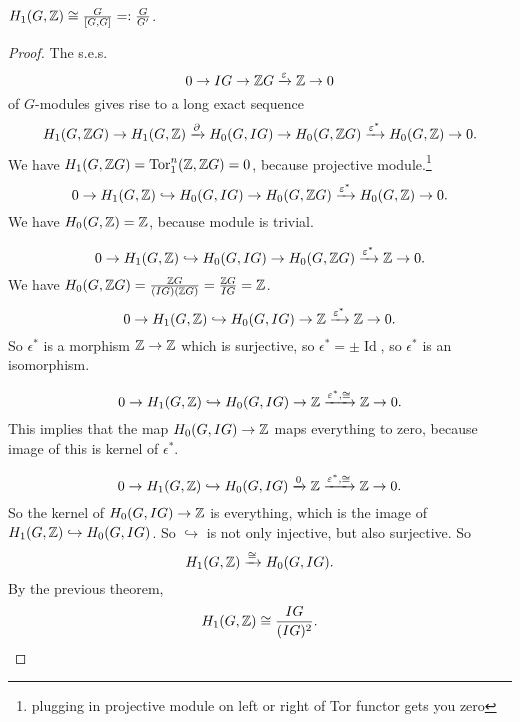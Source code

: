 \begin{prop}
$H_1(G, \mathbb{Z}) \cong \frac{G}{[G,G]} =: \frac{G}{G'}$.
\end{prop}
\begin{proof}
    The s.e.s.
    \[
    0 \to  IG \to  \mathbb{Z} G \xrightarrow{\varepsilon} \mathbb{Z} \to  0
    \] 
    of $G$-modules gives rise to a long exact sequence
    \[
        H_1(G, \mathbb{Z} G) \to  H_1(G, \mathbb{Z}) \xrightarrow{\partial}   H_0(G, IG) \to  H_0(G, \mathbb{Z} G) \xrightarrow{\varepsilon^{*}}   H_0(G, \mathbb{Z}) \to  0
    .\] 
    We have $ H_1(G, \mathbb{Z} G) = \operatorname{Tor}_1^{n}(\mathbb{Z}, \mathbb{Z} G) = 0$, because projective module.\footnote{plugging in projective module on left or right of Tor functor gets you zero}
    \[
        0 \to  H_1(G, \mathbb{Z}) \hookrightarrow   H_0(G, IG) \to  H_0(G, \mathbb{Z} G) \xrightarrow{\varepsilon^{*}}   H_0(G, \mathbb{Z}) \to  0
    .\] 
    We have $H_0(G, \mathbb{Z}) = \mathbb{Z}$, because module is trivial.

    \[
        0 \to  H_1(G, \mathbb{Z}) \hookrightarrow   H_0(G, IG) \to  H_0(G, \mathbb{Z} G) \xrightarrow{\varepsilon^{*}}   \mathbb{Z} \to  0
    .\] 
    We have $ H_0(G, \mathbb{Z} G) = \frac{\mathbb{Z} G}{(IG)(\mathbb{Z} G)} = \frac{\mathbb{Z} G}{IG} = \mathbb{Z}$.
    \[
        0 \to  H_1(G, \mathbb{Z}) \hookrightarrow   H_0(G, IG) \to  \mathbb{Z} \xrightarrow{\varepsilon^{*}}   \mathbb{Z} \to  0
    .\] 
    So $\epsilon^{*}$ is a morphism $\mathbb{Z} \to  \mathbb{Z}$ which is surjective, so $\epsilon^{*} = \pm \operatorname{Id}$, so $\epsilon^{*}$ is an isomorphism.

    \[
        0 \to  H_1(G, \mathbb{Z}) \hookrightarrow   H_0(G, IG) \to  \mathbb{Z} \xrightarrow{\varepsilon^{*}, \cong}   \mathbb{Z} \to  0
    .\] 
    This implies that the map $ H_0(G, IG) \to  \mathbb{Z}$ maps everything to zero, because image of this is kernel of $\epsilon^{*}$.

    \[
        0 \to  H_1(G, \mathbb{Z}) \hookrightarrow   H_0(G, IG) \xrightarrow{0}   \mathbb{Z} \xrightarrow{\varepsilon^{*}, \cong}   \mathbb{Z} \to  0
    .\] 
    So the kernel of $ H_0(G, IG) \to  \mathbb{Z}$ is everything, which is the image of $H_1(G, \mathbb{Z}) \hookrightarrow H_0(G, IG)$.
    So $\hookrightarrow$ is not only injective, but also surjective.
    So  \[
        H_1(G, \mathbb{Z}) \xrightarrow{\cong}  H_0(G, IG)
    .\] 
    By the previous theorem,
    \[
        H_1(G, \mathbb{Z}) \cong \frac{IG}{(IG)^2}
    .\] 
    

\end{proof}
